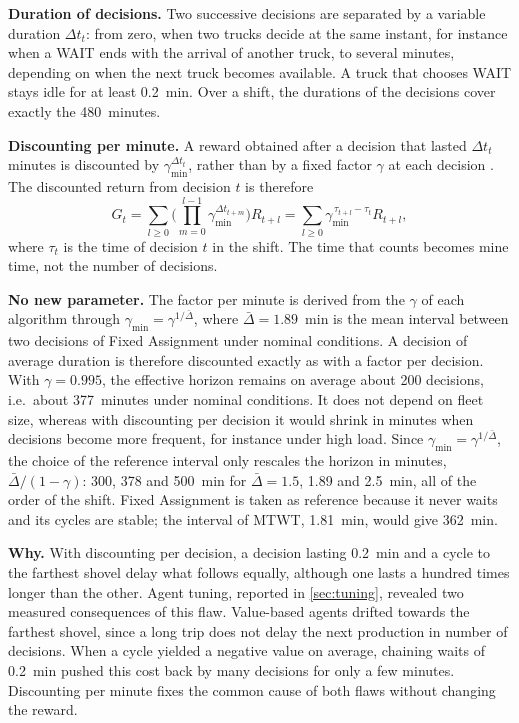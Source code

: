 \documentclass[11pt,a4paper]{article}
\newif\ifrevmarks
\newcommand{\revtag}[1]{\ifrevmarks\textsuperscript{\textcolor{red!70!black}{\scriptsize[#1]}}\fi}
\newenvironment{revbloc}[1]{\par\ifrevmarks\color{revcolor}\noindent\revtag{#1}\ \fi}{\par}
\newif\ifcorrmarks
\newcommand{\corr}[1]{\ifcorrmarks\textcolor{corrcolor}{#1}\else#1\fi}
\begin{document}
\begin{revbloc}{M9, v3}
\textbf{Duration of decisions.} Two successive decisions are separated by a variable duration $\Delta t_t$: \corr{from zero, when two trucks decide at the same instant, for instance when a WAIT ends with the arrival of another truck, to several minutes,} depending on when the next truck becomes available. \corr{A truck that chooses WAIT stays idle for at least 0.2~min.} Over a shift, the durations of the decisions cover exactly the 480~minutes.

\textbf{Discounting per minute.} A reward obtained after a decision that lasted $\Delta t_t$ minutes is discounted by $\gamma_{\min}^{\Delta t_t}$, rather than by a fixed factor $\gamma$ at each decision \cite{BradtkeDuff1995, SuttonPrecupSingh1999}. The discounted return from decision $t$ is therefore
\begin{equation}
G_t = \sum_{l \geq 0} \Big( \prod_{m=0}^{l-1} \gamma_{\min}^{\Delta t_{t+m}} \Big) R_{t+l}
    = \sum_{l \geq 0} \gamma_{\min}^{\,\tau_{t+l} - \tau_t} R_{t+l} ,
\label{eq:smdp-return}
\end{equation}
where $\tau_t$ is the time of decision $t$ in the shift. The time that counts becomes mine time, not the number of decisions.

\textbf{No new parameter.} The factor per minute is derived from the $\gamma$ of each algorithm through $\gamma_{\min} = \gamma^{1/\bar{\Delta}}$, where $\bar{\Delta} = 1.89$~min is the mean interval between two decisions of Fixed Assignment under nominal conditions. A decision of average duration is therefore discounted exactly as with a factor per decision. With $\gamma = 0.995$, the effective horizon remains on average about 200 decisions, i.e.\ about 377~minutes under nominal conditions. It does not depend on fleet size, whereas with discounting per decision it would shrink in minutes when decisions become more frequent, for instance under high load. \corr{Since $\gamma_{\min} = \gamma^{1/\bar\Delta}$, the choice of the reference interval only rescales the horizon in minutes, $\bar\Delta/(1-\gamma)$: 300, 378 and 500~min for $\bar\Delta = 1.5$, 1.89 and 2.5~min, all of the order of the shift. Fixed Assignment is taken as reference because it never waits and its cycles are stable; the interval of MTWT, 1.81~min, would give 362~min.}

\textbf{Why.} With discounting per decision, a decision lasting 0.2~min and a cycle to the farthest shovel delay what follows equally, although one lasts a hundred times longer than the other. Agent tuning, reported in \cref{sec:tuning}, revealed two measured consequences of this flaw. Value-based agents drifted towards the farthest shovel, since a long trip does not delay the next production in number of decisions. When a cycle yielded a negative value on average, chaining waits of 0.2~min pushed this cost back by many decisions for only a few minutes. Discounting per minute fixes the common cause of both flaws without changing the reward.


\end{revbloc}
\end{document}
